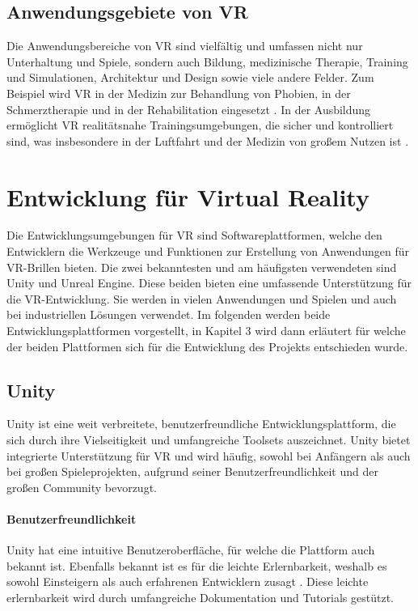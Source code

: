 \subsection{Anwendungsgebiete von VR}
Die Anwendungsbereiche von VR sind vielfältig und umfassen nicht nur Unterhaltung und Spiele, sondern auch Bildung, medizinische Therapie, Training und Simulationen, Architektur und Design sowie viele andere Felder. Zum Beispiel wird VR in der Medizin zur Behandlung von Phobien, in der Schmerztherapie und in der Rehabilitation eingesetzt \cite{rizzo2017}. In der Ausbildung ermöglicht VR realitätsnahe Trainingsumgebungen, die sicher und kontrolliert sind, was insbesondere in der Luftfahrt und der Medizin von großem Nutzen ist \cite{huang2018}.


\section{Entwicklung für Virtual Reality}
Die Entwicklungsumgebungen für VR sind Softwareplattformen, welche den Entwicklern die Werkzeuge und Funktionen zur Erstellung von Anwendungen für VR-Brillen bieten. Die zwei bekanntesten und am häufigsten verwendeten sind Unity und Unreal Engine. Diese beiden bieten eine umfassende Unterstützung für die VR-Entwicklung. Sie werden in vielen Anwendungen und Spielen und auch bei industriellen Lösungen verwendet. Im folgenden werden beide Entwicklungsplattformen vorgestellt, in Kapitel 3 wird dann erläutert für welche der beiden Plattformen sich für die Entwicklung des Projekts entschieden wurde.
\subsection{Unity}
Unity ist eine weit verbreitete, benutzerfreundliche Entwicklungsplattform, die sich durch ihre Vielseitigkeit und umfangreiche Toolsets auszeichnet. Unity bietet integrierte Unterstützung für VR und wird häufig, sowohl bei Anfängern als auch bei großen Spieleprojekten, aufgrund seiner Benutzerfreundlichkeit und der großen Community bevorzugt.
\paragraph{Benutzerfreundlichkeit}
Unity hat eine intuitive Benutzeroberfläche, für welche die Plattform auch bekannt ist. Ebenfalls bekannt ist es für die leichte Erlernbarkeit, weshalb es sowohl Einsteigern als auch erfahrenen Entwicklern zusagt \cite{unity2021}. Diese leichte erlernbarkeit wird durch umfangreiche Dokumentation und Tutorials gestützt.

